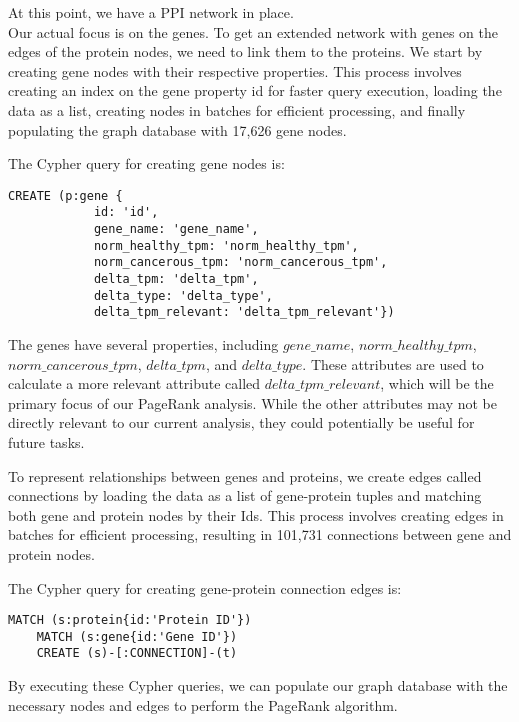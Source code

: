At this point, we have a PPI network in place. \\


Our actual focus is on the genes.
To get an extended network with genes on the edges of the protein nodes, we need to link them to the proteins.
We start by creating gene nodes with their respective properties.
This process involves creating an index on the gene property id for faster query execution,
loading the data as a list, creating nodes in batches for efficient processing, and finally populating the graph database with 17,626 gene nodes.

The Cypher query for creating gene nodes is:
\begin{lstlisting}[language=Cypher, label={lst:gene_nodes}]
    CREATE (p:gene {
            id: 'id',
            gene_name: 'gene_name',
            norm_healthy_tpm: 'norm_healthy_tpm',
            norm_cancerous_tpm: 'norm_cancerous_tpm',
            delta_tpm: 'delta_tpm',
            delta_type: 'delta_type',
            delta_tpm_relevant: 'delta_tpm_relevant'})
\end{lstlisting}

The genes have several properties, including $gene\_name$, $norm\_healthy\_tpm$, $norm\_cancerous\_tpm$, $delta\_tpm$, and $delta\_type$.
These attributes are used to calculate a more relevant attribute called $delta\_tpm\_relevant$, which will be the primary focus of our PageRank analysis.
While the other attributes may not be directly relevant to our current analysis, they could potentially be useful for future tasks.

To represent relationships between genes and proteins, we create edges called connections by loading the data as a list of gene-protein tuples
and matching both gene and protein nodes by their Ids.
This process involves creating edges in batches for efficient processing, resulting in 101,731 connections between gene and protein nodes.

The Cypher query for creating gene-protein connection edges is:
\begin{lstlisting}[language=Cypher, label={lst:gene_protein_edges}]
    MATCH (s:protein{id:'Protein ID'})
    MATCH (s:gene{id:'Gene ID'})
    CREATE (s)-[:CONNECTION]-(t)
\end{lstlisting}

By executing these Cypher queries, we can populate our graph database with the necessary nodes and edges to perform the PageRank algorithm.\\



